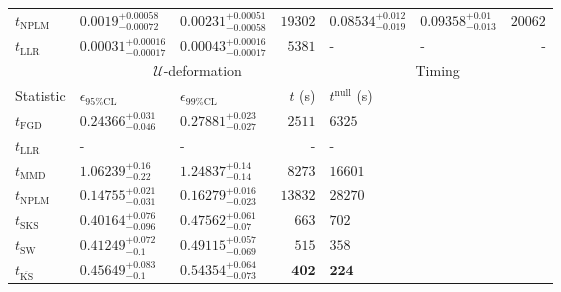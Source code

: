 \begin{tabular}{l|llr|llr}
\rowcolor{red!35}	$t_{\mathrm{NPLM}}$ & $0.0019_{-0.00072}^{+0.00058}$ & $0.00231_{-0.00058}^{+0.00051}$ & $19302$ & $0.08534_{-0.019}^{+0.012}$ & $0.09358_{-0.013}^{+0.01}$ & $20062$ \\
	$t_{\mathrm{LLR}}$ & $0.00031_{-0.00017}^{+0.00016}$ & $0.00043_{-0.00017}^{+0.00016}$ & $5381$ & - & - & - \\
	\toprule
	\multicolumn{1}{c}{} & \multicolumn{3}{c}{$\mathcal{U}$-deformation} & \multicolumn{3}{c}{Timing} \\
	Statistic & $\epsilon_{95\%\mathrm{CL}}$ & $\epsilon_{99\%\mathrm{CL}}$ & $t$ (s) & $t^{\mathrm{null}}$ (s) \\
	\midrule
	$t_{\mathrm{FGD}}$ & ${\mathbf{0.24366_{-0.046}^{+0.031}}}$ & ${\mathbf{0.27881_{-0.027}^{+0.023}}}$ & $2511$ & $6325$ \\
	$t_{\mathrm{LLR}}$ & - & - & - & - \\
	$t_{\mathrm{MMD}}$ & $1.06239_{-0.22}^{+0.16}$ & $1.24837_{-0.14}^{+0.14}$ & $8273$ & $16601$ \\
\rowcolor{red!35}	$t_{\mathrm{NPLM}}$ & $0.14755_{-0.031}^{+0.021}$ & $0.16279_{-0.023}^{+0.016}$ & $13832$ & $28270$ \\
	$t_{\mathrm{SKS}}$ & $0.40164_{-0.096}^{+0.076}$ & $0.47562_{-0.07}^{+0.061}$ & $663$ & $702$ \\
	$t_{\mathrm{SW}}$ & $0.41249_{-0.1}^{+0.072}$ & $0.49115_{-0.069}^{+0.057}$ & $515$ & $358$ \\
	$t_{\overline{\mathrm{KS}}}$ & $0.45649_{-0.1}^{+0.083}$ & $0.54354_{-0.073}^{+0.064}$ & ${\mathbf{402}}$ & ${\mathbf{224}}$ \\
	\bottomrule
\end{tabular}